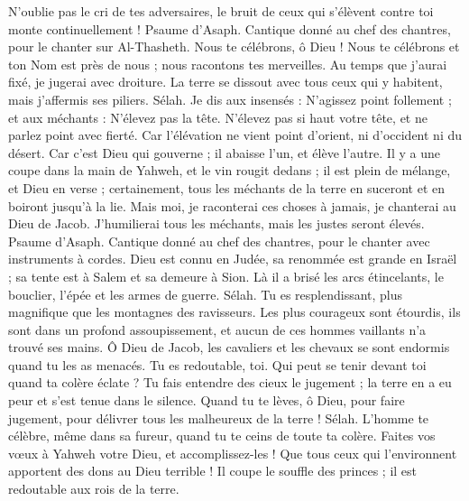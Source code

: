 \begin{multicols}{2}
N'oublie pas le cri de tes adversaires, le bruit de ceux qui s'élèvent contre toi monte continuellement !
\VerseOne{}Psaume d'Asaph. Cantique donné au chef des chantres, pour le chanter sur Al-Thasheth.
Nous te célébrons, ô Dieu ! Nous te célébrons et ton Nom est près de nous ; nous racontons tes merveilles.
Au temps que j'aurai fixé, je jugerai avec droiture.
La terre se dissout avec tous ceux qui y habitent, mais j'affermis ses piliers. Sélah.
Je dis aux insensés : N'agissez point follement ; et aux méchants : N'élevez pas la tête.
N'élevez pas si haut votre tête, et ne parlez point avec fierté.
Car l'élévation ne vient point d'orient, ni d'occident ni du désert.
Car c'est Dieu qui gouverne ; il abaisse l'un, et élève l'autre.
Il y a une coupe dans la main de Yahweh, et le vin rougit dedans ; il est plein de mélange, et Dieu en verse ; certainement, tous les méchants de la terre en suceront et en boiront jusqu'à la lie.
Mais moi, je raconterai ces choses à jamais, je chanterai au Dieu de Jacob.
J'humilierai tous les méchants, mais les justes seront élevés.
\VerseOne{}Psaume d'Asaph. Cantique donné au chef des chantres, pour le chanter avec instruments à cordes.
Dieu est connu en Judée, sa renommée est grande en Israël ;
sa tente est à Salem et sa demeure à Sion.
Là il a brisé les arcs étincelants, le bouclier, l'épée et les armes de guerre. Sélah.
Tu es resplendissant, plus magnifique que les montagnes des ravisseurs.
Les plus courageux sont étourdis, ils sont dans un profond assoupissement, et aucun de ces hommes vaillants n'a trouvé ses mains.
Ô Dieu de Jacob, les cavaliers et les chevaux se sont endormis quand tu les as menacés.
Tu es redoutable, toi. Qui peut se tenir devant toi quand ta colère éclate ?
Tu fais entendre des cieux le jugement ; la terre en a eu peur et s'est tenue dans le silence.
Quand tu te lèves, ô Dieu, pour faire jugement, pour délivrer tous les malheureux de la terre ! Sélah.
L'homme te célèbre, même dans sa fureur, quand tu te ceins de toute ta colère.
Faites vos vœux à Yahweh votre Dieu, et accomplissez-les ! Que tous ceux qui l'environnent apportent des dons au Dieu terrible !
Il coupe le souffle des princes ; il est redoutable aux rois de la terre.

\end{multicols}
